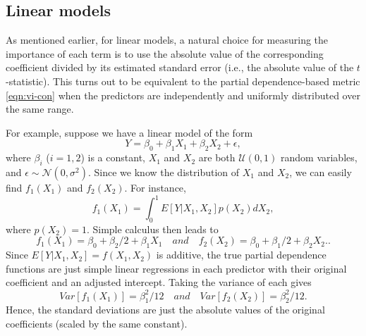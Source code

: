 \documentclass[12pt]{article}
\begin{document}
\subsection{Linear models}
\label{sec:linear}

As mentioned earlier, for linear models, a natural choice for measuring the importance of each term is to use the absolute value of the corresponding coefficient divided by its estimated standard error (i.e., the absolute value of the $t$-statistic). This turns out to be equivalent to the partial dependence-based metric \eqref{eqn:vi-con} when the predictors are independently and uniformly distributed over the same range.

For example, suppose we have a linear model of the form
\begin{equation*}
  Y = \beta_0 + \beta_1 X_1 + \beta_2 X_2 + \epsilon,
\end{equation*}
where $\beta_i$ ($i = 1, 2$) is a constant, $X_1$ and $X_2$ are both $\mathcal{U}\left(0, 1\right)$ random variables, and $\epsilon \sim \mathcal{N}\left(0, \sigma ^ 2\right)$. Since we know the distribution of $X_1$ and $X_2$, we can easily find $f_1\left(X_1\right)$ and $f_2\left(X_2\right)$. For instance, 
\begin{equation*}
  f_1\left(X_1\right) = \int_0^1 E\left[Y | X_1, X_2\right] p\left(X_2\right) dX_2,
\end{equation*}
where $p\left(X_2\right) = 1$. Simple calculus then leads to 
\begin{equation*}
  f_1\left(X_1\right) = \beta_0 + \beta_2 / 2 + \beta_1 X_1 \quad and \quad f_2\left(X_2\right) = \beta_0 + \beta_1 / 2 + \beta_2 X_2..
\end{equation*}
Since $E\left[Y | X_1, X_2\right] = f\left(X_1, X_2\right)$ is additive, the true partial dependence functions are just simple linear regressions in each predictor with their original coefficient and an adjusted intercept. Taking the variance of each gives
\begin{equation*}
Var\left[f_1\left(X_1\right)\right] = \beta_1 ^ 2 / 12 \quad and \quad Var\left[f_2\left(X_2\right)\right] = \beta_2 ^ 2 / 12.
\end{equation*}
Hence, the standard deviations are just the absolute values of the original coefficients (scaled by the same constant).
\end{document}
